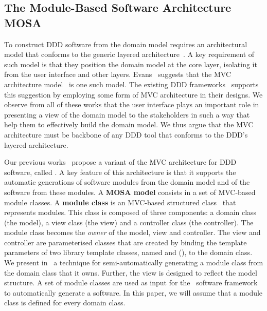 \subsection{The Module-Based Software Architecture MOSA}
\label{sect:bg-arch} %

To construct DDD software from the domain model requires an architectural model that conforms to the generic layered architecture~\cite{evans_domain-driven_2004, vernon_implementing_2013}. A key requirement of such model is that they position the domain model at the core layer, isolating it from the user interface and other layers. Evans~\cite{evans_domain-driven_2004} suggests that the MVC architecture model~\cite{krasner_description_1988} is one such model. The existing DDD frameworks~\cite{dan_haywood_apache_2013,paniza_learn_2011} supports this suggestion by employing some form of MVC architecture in their designs. We observe from all of these works that the user interface plays an important role in presenting a view of the domain model to the stakeholders in such a way that help them to effectively build the domain model. We thus argue that the MVC architecture must be backbone of any DDD tool that conforms to the DDD's layered architecture. 

Our previous works~\cite{le_tree-based_2015, le_generative_2018} propose a variant of the MVC architecture for DDD software, called . A key feature of this architecture is that it supports the automatic generations of software modules from the domain model and of the software from these modules.
%
A \textbf{MOSA model} consists in a set of MVC-based module classes. 
A \textbf{module class} is an MVC-based structured class~\cite{omg_unified_2015} that represents modules. This class is composed of three components: a domain class (the model), a view class (the view) and a controller class (the controller). The module class becomes the \textit{owner} of the model, view and controller. The view and controller are parameterised classes that are created by binding the template parameters of two library template classes, named  and  (\resp), to the domain class.
%
We present in~\cite{le_generative_2018} a technique for semi-automatically generating a module class from the domain class that it owns. Further, the view is designed to reflect the model structure. A set of module classes are used as input for the \jdomainapp~software framework~\cite{le_jdomainapp_2017} to automatically generate a software. In this paper, we will assume that a module class is defined for every domain class.

